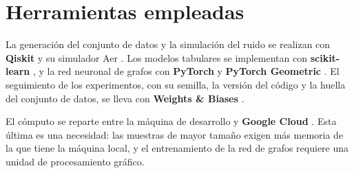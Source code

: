 \chapter{Herramientas empleadas}
\label{sec:herramientas}

La generación del conjunto de datos y la simulación del ruido se realizan con \textbf{Qiskit}
y su simulador Aer \cite{javadi2024qiskit}. Los modelos tabulares se implementan con
\textbf{scikit-learn} \cite{pedregosa2011scikit}, y la red neuronal de grafos con
\textbf{PyTorch} \cite{paszke2019pytorch} y \textbf{PyTorch Geometric}
\cite{fey2019pyg}. El seguimiento de los experimentos, con su semilla, la versión del código
y la huella del conjunto de datos, se lleva con \textbf{Weights \& Biases}
\cite{biewald2020wandb}.

El cómputo se reparte entre la máquina de desarrollo y \textbf{Google Cloud}
\cite{google2026cloud}. Esta última es una necesidad: las muestras de
mayor tamaño exigen más memoria de la que tiene la máquina local, y el entrenamiento de la
red de grafos requiere una unidad de procesamiento gráfico.
